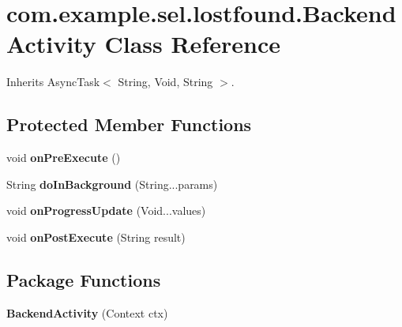 \hypertarget{classcom_1_1example_1_1sel_1_1lostfound_1_1BackendActivity}{\section{com.\-example.\-sel.\-lostfound.\-Backend\-Activity \-Class \-Reference}
\label{classcom_1_1example_1_1sel_1_1lostfound_1_1BackendActivity}
}


\-Inherits \-Async\-Task$<$ String, Void, String $>$.

\subsection*{\-Protected \-Member \-Functions}
\begin{DoxyCompactItemize}
\item 
\hypertarget{classcom_1_1example_1_1sel_1_1lostfound_1_1BackendActivity_a679cd5822b3d0b71b8a947eab9ff6c79}{void {\bfseries on\-Pre\-Execute} ()}\label{classcom_1_1example_1_1sel_1_1lostfound_1_1BackendActivity_a679cd5822b3d0b71b8a947eab9ff6c79}

\item 
\hypertarget{classcom_1_1example_1_1sel_1_1lostfound_1_1BackendActivity_a4e9c46f342ba6738cdd50c9c75fb3ec7}{\-String {\bfseries do\-In\-Background} (\-String...\-params)}\label{classcom_1_1example_1_1sel_1_1lostfound_1_1BackendActivity_a4e9c46f342ba6738cdd50c9c75fb3ec7}

\item 
\hypertarget{classcom_1_1example_1_1sel_1_1lostfound_1_1BackendActivity_a6a2bf0fca03b89c35cd48befe848ee8d}{void {\bfseries on\-Progress\-Update} (\-Void...\-values)}\label{classcom_1_1example_1_1sel_1_1lostfound_1_1BackendActivity_a6a2bf0fca03b89c35cd48befe848ee8d}

\item 
\hypertarget{classcom_1_1example_1_1sel_1_1lostfound_1_1BackendActivity_aa2e67993396f2bf74577e6ff84e16b44}{void {\bfseries on\-Post\-Execute} (\-String result)}\label{classcom_1_1example_1_1sel_1_1lostfound_1_1BackendActivity_aa2e67993396f2bf74577e6ff84e16b44}

\end{DoxyCompactItemize}
\subsection*{\-Package \-Functions}
\begin{DoxyCompactItemize}
\item 
\hypertarget{classcom_1_1example_1_1sel_1_1lostfound_1_1BackendActivity_a19192130b4f4acbaed1b0a2f85fa2fef}{{\bfseries \-Backend\-Activity} (\-Context ctx)}\label{classcom_1_1example_1_1sel_1_1lostfound_1_1BackendActivity_a19192130b4f4acbaed1b0a2f85fa2fef}

\end{DoxyCompactItemize}
